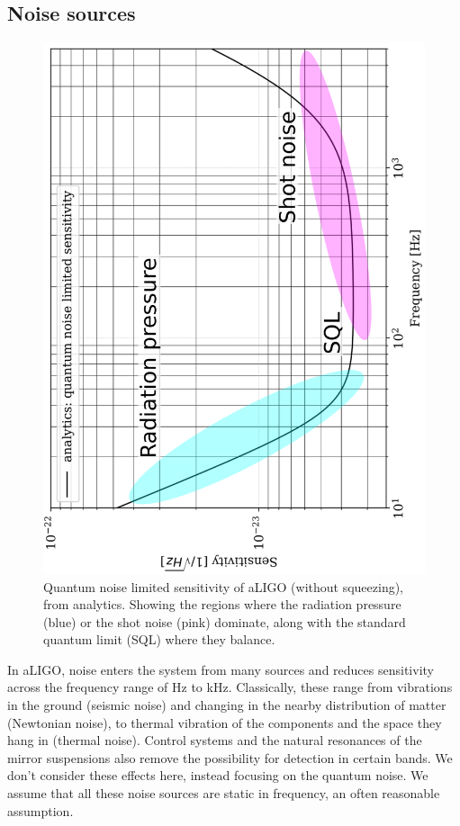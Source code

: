 \documentclass[aps,pra,superscriptaddress,reprint,nofootinbib]{revtex4-1}
\begin{document}
\subsection{Noise sources}
\label{sec:noise_sources}

\begin{figure}
	\begin{center}
	\includegraphics[height=0.8\textwidth, angle=-90]{figures/sqz_aLIGO_analytics_quantum_noise_budget-labelled.pdf}
	\end{center}
	\caption{Quantum noise limited sensitivity of aLIGO (without squeezing), from analytics. Showing the regions where the radiation pressure (blue) or the shot noise (pink) dominate, along with the standard quantum limit (SQL) where they balance.}
	\label{fig:sqz_aLIGO_analytics_quantum_noise_budget}
\end{figure}


In aLIGO, noise enters the system from many sources and reduces sensitivity across the frequency range of Hz to kHz. Classically, these range from vibrations in the ground (seismic noise) and changing in the nearby distribution of matter (Newtonian noise), to thermal vibration of the components and the space they hang in (thermal noise). Control systems and the natural resonances of the mirror suspensions also remove the possibility for detection in certain bands. We don’t consider these effects here, instead focusing on the quantum noise. We assume that all these noise sources are static in frequency, an often reasonable assumption. 
\end{document}
